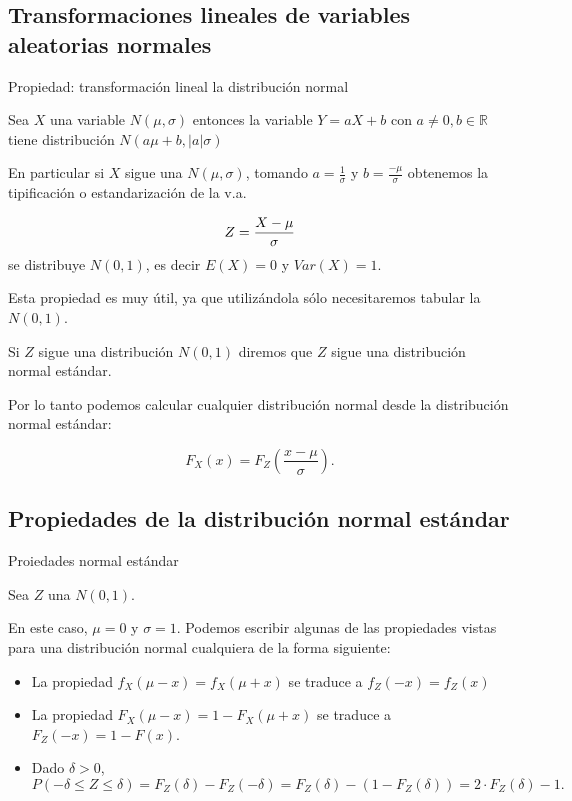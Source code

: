 \documentclass[
  letterpaper,
  DIV=11,
  numbers=noendperiod]{scrreprt}
\providecommand{\tightlist}{%
  \setlength{\itemsep}{0pt}\setlength{\parskip}{0pt}}\usepackage{longtable,booktabs,array}
\begin{document}
\subsection{Transformaciones lineales de variables aleatorias
normales}\label{transformaciones-lineales-de-variables-aleatorias-normales}

\begin{Proposicion}{Propiedad: transformación lineal la distribución normal}{}

Sea \(X\) una variable \(N(\mu,\sigma)\) entonces la variable
\(Y=a X+b\) con \(a\not=0,b\in\mathbb{R}\) tiene distribución
\(N(a\mu+b, |a| \sigma)\)

En particular si \(X\) sigue una \(N(\mu,\sigma)\), tomando
\(a=\frac1{\sigma}\) y \(b=
\frac{-\mu}{\sigma}\) obtenemos la tipificación o estandarización de la
v.a.

\[Z={{X-\mu}\over {\sigma}}\] se distribuye \(N(0,1)\), es decir
\(E(X)=0\) y \(Var(X)=1\).

Esta propiedad es muy útil, ya que utilizándola sólo necesitaremos
tabular la \(N(0,1)\).

Si \(Z\) sigue una distribución \(N(0,1)\) diremos que \(Z\) sigue una
distribución normal estándar.

Por lo tanto podemos calcular cualquier distribución normal desde la
distribución normal estándar:

\[
F_X(x)=F_Z \left(\frac{x-\mu}{\sigma}\right).
\]

\end{Proposicion}

\subsection{Propiedades de la distribución normal
estándar}\label{propiedades-de-la-distribuciuxf3n-normal-estuxe1ndar}

\begin{Proposicion}{Proiedades normal estándar}{}

Sea \(Z\) una \(N(0,1)\).

En este caso, \(\mu=0\) y \(\sigma=1\). Podemos escribir algunas de las
propiedades vistas para una distribución normal cualquiera de la forma
siguiente:

\begin{itemize}
\tightlist
\item
  La propiedad \(f_X(\mu-x)=f_X(\mu+x)\) se traduce a \(f_Z(-x)=f_Z(x)\)
\item
  La propiedad \(F_X(\mu-x)=1-F_X(\mu+x)\) se traduce a
  \(F_Z(-x)=1-F(x).\)
\item
  Dado \(\delta>0\), \[
  P(-\delta\leq Z \leq \delta)=F_{Z}(\delta)-F_{Z}(-\delta)=F_Z(\delta)-(1-F_Z(\delta))=
  2\cdot F_Z(\delta)-1.
  \]
\end{itemize}

\end{Proposicion}
\end{document}
